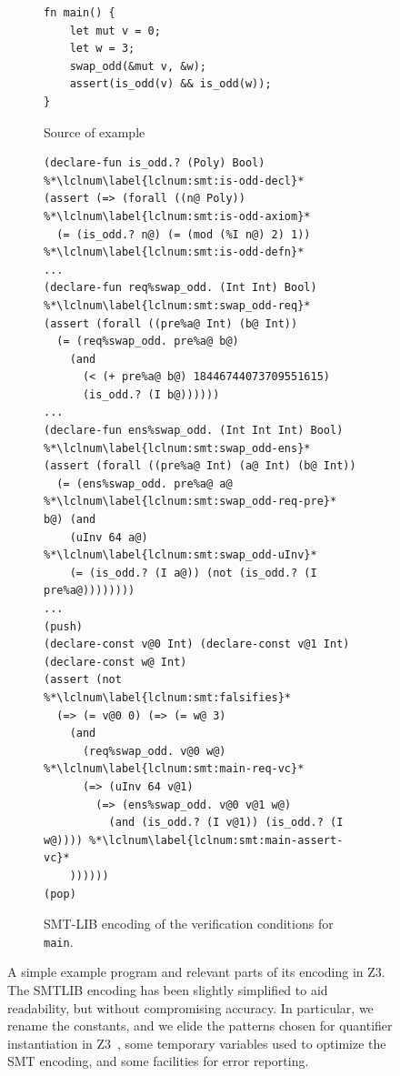 \begin{figure}
\begin{subfigure}[t]{.38\textwidth}
\begin{lstlisting}[language=Verus,style=VerusLineNos,firstnumber=5]
\end{lstlisting}
\vspace{3.3em}
\begin{lstlisting}[language=Verus,style=VerusLineNos,firstnumber=13]
fn main() {
    let mut v = 0;
    let w = 3;
    swap_odd(&mut v, &w);
    assert(is_odd(v) && is_odd(w));
}
\end{lstlisting}
    \caption{Source of example}
    \end{subfigure}
    \hfill
    \begin{subfigure}[t]{.61\textwidth}
    \begin{lstlisting}[style=VerusLineNos]
(declare-fun is_odd.? (Poly) Bool) %*\lclnum\label{lclnum:smt:is-odd-decl}*
(assert (=> (forall ((n@ Poly)) %*\lclnum\label{lclnum:smt:is-odd-axiom}*
  (= (is_odd.? n@) (= (mod (%I n@) 2) 1)) %*\lclnum\label{lclnum:smt:is-odd-defn}*
...
(declare-fun req%swap_odd. (Int Int) Bool) %*\lclnum\label{lclnum:smt:swap_odd-req}*
(assert (forall ((pre%a@ Int) (b@ Int))
  (= (req%swap_odd. pre%a@ b@)
    (and
      (< (+ pre%a@ b@) 18446744073709551615)
      (is_odd.? (I b@))))))
...
(declare-fun ens%swap_odd. (Int Int Int) Bool) %*\lclnum\label{lclnum:smt:swap_odd-ens}*
(assert (forall ((pre%a@ Int) (a@ Int) (b@ Int))
  (= (ens%swap_odd. pre%a@ a@ %*\lclnum\label{lclnum:smt:swap_odd-req-pre}* b@) (and
    (uInv 64 a@) %*\lclnum\label{lclnum:smt:swap_odd-uInv}*
    (= (is_odd.? (I a@)) (not (is_odd.? (I pre%a@))))))))
...
(push)
(declare-const v@0 Int) (declare-const v@1 Int)
(declare-const w@ Int)
(assert (not %*\lclnum\label{lclnum:smt:falsifies}*
  (=> (= v@0 0) (=> (= w@ 3)
    (and
      (req%swap_odd. v@0 w@) %*\lclnum\label{lclnum:smt:main-req-vc}*
      (=> (uInv 64 v@1)
        (=> (ens%swap_odd. v@0 v@1 w@)
          (and (is_odd.? (I v@1)) (is_odd.? (I w@)))) %*\lclnum\label{lclnum:smt:main-assert-vc}*
    ))))))
(pop)
\end{lstlisting}
\caption{SMT-LIB encoding of the verification conditions for \texttt{main}.}
\end{subfigure}
    \caption{A simple example program and relevant parts of its encoding in Z3. The SMTLIB encoding
    has been slightly simplified to aid readability, but without compromising accuracy. In particular,
    we rename the constants, and we elide the patterns chosen for quantifier instantiation in Z3~\cite{e-matching},
    some temporary variables used to optimize the SMT encoding, and some facilities for error reporting.} \label{fig:encoding-example}
\end{figure}

